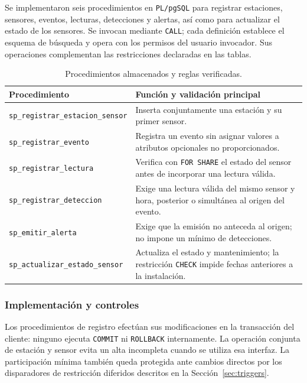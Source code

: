 \documentclass[12pt,a4paper]{article}
\begin{document}
Se implementaron seis procedimientos en \texttt{PL/pgSQL} para registrar
estaciones, sensores, eventos, lecturas, detecciones y alertas, así como
para actualizar el estado de los sensores. Se invocan mediante
\texttt{CALL}; cada definición establece el esquema de búsqueda y
opera con los permisos del usuario invocador. Sus operaciones complementan
las restricciones declaradas en las tablas.

\begin{table}[H]
\centering\small
\begin{tabular}{>{\raggedright\arraybackslash}p{5.9cm}>{\raggedright\arraybackslash}p{8.2cm}}
\toprule
\textbf{Procedimiento} & \textbf{Función y validación principal} \\
\midrule
\nolinkurl{sp_registrar_estacion_sensor} & Inserta conjuntamente una estación y su primer sensor. \\
\nolinkurl{sp_registrar_evento} & Registra un evento sin asignar valores a atributos opcionales no proporcionados. \\
\nolinkurl{sp_registrar_lectura} & Verifica con \texttt{FOR SHARE} el estado del sensor antes de incorporar una lectura válida. \\
\nolinkurl{sp_registrar_deteccion} & Exige una lectura válida del mismo sensor y hora, posterior o simultánea al origen del evento. \\
\nolinkurl{sp_emitir_alerta} & Exige que la emisión no anteceda al origen; no impone un mínimo de detecciones. \\
\nolinkurl{sp_actualizar_estado_sensor} & Actualiza el estado y mantenimiento; la restricción \texttt{CHECK} impide fechas anteriores a la instalación. \\
\bottomrule
\end{tabular}
\caption{Procedimientos almacenados y reglas verificadas.}
\label{tab:procedimientos-45}
\end{table}

\subsubsection*{Implementación y controles}

Los procedimientos de registro efectúan sus modificaciones en la
transacción del cliente: ninguno ejecuta \texttt{COMMIT} ni
\texttt{ROLLBACK} internamente. La operación conjunta de estación y
sensor evita un alta incompleta cuando se utiliza esa interfaz. La
participación mínima también queda protegida ante cambios directos
por los disparadores de restricción diferidos descritos en la
Sección~\ref{sec:triggers}.
\end{document}
